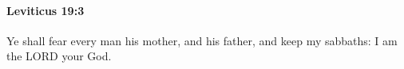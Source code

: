 
		\paragraph{Leviticus 19:3} %
			\label{LEVITICUS-19-3}

			Ye shall fear every man his mother, and his father, and keep my sabbaths: I am the LORD your God.


